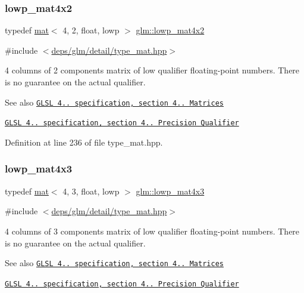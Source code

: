 \subsubsection{\texorpdfstring{lowp\+\_\+mat4x2}{lowp\_mat4x2}}
{\footnotesize\ttfamily typedef \hyperlink{structglm_1_1mat}{mat}$<$ 4, 2, float, lowp $>$ \hyperlink{group__core__precision_gacd6c35b61e9de6ad39767ea58660a602}{glm\+::lowp\+\_\+mat4x2}}



{\ttfamily \#include $<$\hyperlink{type__mat_8hpp}{deps/glm/detail/type\+\_\+mat.\+hpp}$>$}

4 columns of 2 components matrix of low qualifier floating-\/point numbers. There is no guarantee on the actual qualifier.

\begin{DoxySeeAlso}{See also}
\href{http://www.opengl.org/registry/doc/GLSLangSpec.4.20.8.pdf}{\tt G\+L\+SL 4.. specification, section 4.. Matrices} 

\href{http://www.opengl.org/registry/doc/GLSLangSpec.4.20.8.pdf}{\tt G\+L\+SL 4.. specification, section 4.. Precision Qualifier} 
\end{DoxySeeAlso}


Definition at line 236 of file type\+\_\+mat.\+hpp.

\mbox{\label{group__core__precision_ga23926fa6809eae2c18451a1a7b4dd6a8}} 
\subsubsection{\texorpdfstring{lowp\+\_\+mat4x3}{lowp\_mat4x3}}
{\footnotesize\ttfamily typedef \hyperlink{structglm_1_1mat}{mat}$<$ 4, 3, float, lowp $>$ \hyperlink{group__core__precision_ga23926fa6809eae2c18451a1a7b4dd6a8}{glm\+::lowp\+\_\+mat4x3}}



{\ttfamily \#include $<$\hyperlink{type__mat_8hpp}{deps/glm/detail/type\+\_\+mat.\+hpp}$>$}

4 columns of 3 components matrix of low qualifier floating-\/point numbers. There is no guarantee on the actual qualifier.

\begin{DoxySeeAlso}{See also}
\href{http://www.opengl.org/registry/doc/GLSLangSpec.4.20.8.pdf}{\tt G\+L\+SL 4.. specification, section 4.. Matrices} 

\href{http://www.opengl.org/registry/doc/GLSLangSpec.4.20.8.pdf}{\tt G\+L\+SL 4.. specification, section 4.. Precision Qualifier} 
\end{DoxySeeAlso}


